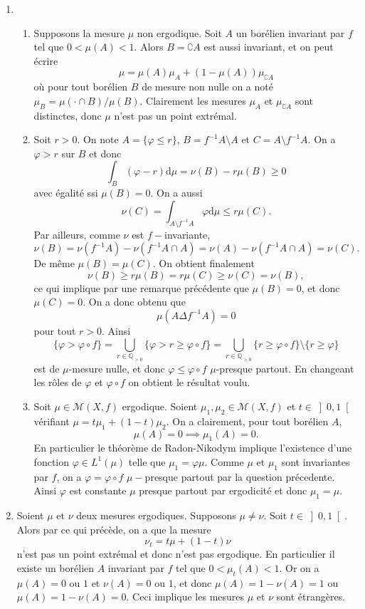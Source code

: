 \documentclass[a4paper,10pt,openany]{article}
\theoremstyle{plain}
\theoremstyle{definition}
\newcommand{\dd}{\mathrm{d}}
\begin{document}
\noindent
\begin{enumerate}
\item
\begin{enumerate}
\item Supposons la mesure $\mu$ non ergodique. Soit $A$ un bor\'elien invariant par $f$ tel que $0 < \mu(A) < 1$. Alors $B = \complement A$ est aussi invariant, et on peut \'ecrire
$$
\mu = \mu(A) \mu_A + (1 - \mu(A)) \mu_{\complement A}
$$
o\`u pour tout bor\'elien $B$ de mesure non nulle on a not\'e $\mu_B = \mu(\cdot \cap B) / \mu(B)$. Clairement les mesures $\mu_A$ et $\mu_{\complement A}$ sont distinctes, donc $\mu$ n'est pas un point extr\'emal.

\item Soit $r > 0$. On note $A = \{\varphi \leqslant r\}$, $B = f^{-1}A \setminus A$ et $C = A \setminus f^{-1}A.$ On a $\varphi > r$ sur $B$ et donc
$$
\int_B(\varphi - r)\dd \mu = \nu(B) - r \mu(B) \geqslant 0
$$
avec \'egalit\'e ssi $\mu(B) = 0.$ On a aussi
$$
\nu(C) = \int_{A \setminus f^{-1}A} \varphi \dd \mu \leqslant r \mu(C).
$$
Par ailleurs, comme $\nu$ est $f-$invariante,
$$
\nu(B) = \nu(f^{-1}A) - \nu(f^{-1}A \cap A) =  \nu(A) - \nu(f^{-1}A \cap A)  = \nu(C).
$$
De m\^eme $\mu(B) = \mu(C).$ On obtient finalement
$$
\nu(B) \geqslant r\mu(B) = r\mu(C) \geqslant \nu(C) = \nu(B),
$$
ce qui implique par une remarque pr\'ec\'edente que $\mu(B) = 0$, et donc $\mu(C) = 0$. On a donc obtenu que
$$
\mu\left( A \Delta f^{-1}A\right) = 0
$$
pour tout $r > 0$. Ainsi
$$
\{\varphi > \varphi \circ f\} = \bigcup_{r \in \mathbb Q_{>0}} \{\varphi > r \geqslant \varphi \circ f\} = \bigcup_{r \in \mathbb Q_{>0}} \{r \geqslant \varphi \circ f\}\setminus\{r \geqslant \varphi\}
$$
est de $\mu$-mesure nulle, et donc $\varphi \leqslant \varphi \circ f$ $\mu$-presque partout. En changeant les r\^oles de $\varphi$ et $\varphi \circ f$ on obtient le r\'esultat voulu.

\item
Soit $\mu \in \mathcal{M}(X,f)$ ergodique. Soient $\mu_1, \mu_2 \in \mathcal{M}(X,f)$ et $t \in \left]0,1\right[$ v\'erifiant $\mu = t\mu_1 + (1-t)\mu_2$. On a clairement, pour tout bor\'elien $A$,
$$
\mu(A) = 0 \implies \mu_1(A) = 0.
$$
En particulier le th\'eor\`eme de Radon-Nikodym implique l'existence d'une fonction $\varphi \in L^1(\mu)$ telle que $\mu_1 = \varphi \mu.$ Comme $\mu$ et $\mu_1$ sont invariantes par $f$, on a $\varphi = \varphi \circ f$ $\mu-$presque partout par la question pr\'ecedente. Ainsi $\varphi$ est constante $\mu$ presque partout par ergodicit\'e et donc $\mu_1 = \mu.$
\end{enumerate}

\item Soient $\mu$ et $\nu$ deux mesures ergodiques. Supposons $\mu \neq \nu$. Soit $t \in \left]0, 1\right[$. Alors par ce qui pr\'ec\`ede, on a que la mesure
$$
\nu_t = t\mu + (1-t)\nu
$$
n'est pas un point extr\'emal et donc n'est pas ergodique. En particulier il existe un bor\'elien $A$ invariant par $f$ tel que $0 < \mu_t(A) < 1$. Or on a $\mu(A) = 0$ ou $1$ et $\nu(A) = 0$ ou $1$, et donc $\mu(A) = 1 - \nu(A) = 1$ ou $\mu(A) = 1 - \nu(A) = 0$. Ceci implique les mesures $\mu$ et $\nu$ sont \'etrang\`eres.
\end{enumerate}
\end{document}
